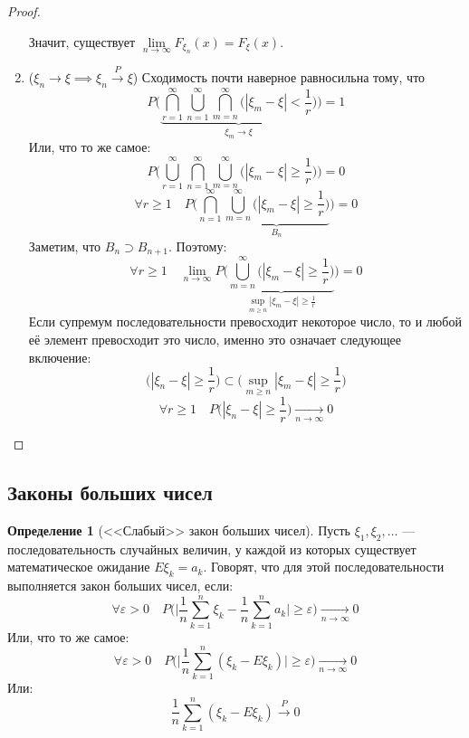 \documentclass[11pt,openany,a4paper]{scrartcl}
\theoremstyle{plain}
\theoremstyle{definition}
\newtheorem{definition}[theorem]{Определение}
\newcommand{\underto}[1]{\xrightarrow[#1]{}}
\newcommand{\overto}[1]{\xrightarrow{#1}}
\begin{document}
\begin{proof}
\begin{enumerate}
        Значит, существует $\lim\limits_{n \to \infty} F_{\xi_n}(x) = F_\xi(x)$.
        \item
        ($\xi_n \to \xi \implies \xi_n \overto{P} \xi$)
        Сходимость почти наверное равносильна тому, что
        $$
        P\bigg(\underbrace{\bigcap_{r=1}^\infty\bigcup_{n=1}^\infty
        \bigcap_{m=n}^\infty
        \Big(|\xi_m - \xi| < \frac{1}{r}\Big)}_{\xi_m \to \xi}\bigg) = 1
        $$
        Или, что то же самое:
        $$
        P\bigg(\bigcup_{r=1}^\infty\bigcap_{n=1}^\infty\bigcup_{m=n}^\infty
        \Big(|\xi_m - \xi| \geqslant \frac{1}{r}\Big)\bigg) = 0
        $$
        $$
        \forall r\geqslant 1\quad
        P\bigg(\bigcap_{n=1}^\infty\underbrace{\bigcup_{m=n}^\infty\Big(|\xi_m - \xi| 
        \geqslant \frac{1}{r}\Big)}_{B_n}\bigg) = 0
        $$
        Заметим, что $B_n \supset B_{n+1}$. Поэтому:
        $$
        \forall r\geqslant1\quad
        \lim\limits_{n \to \infty}P\bigg(\underbrace{\bigcup_{m=n}^\infty
        \Big(|\xi_m - \xi| 
        \geqslant \frac{1}{r}\Big)}_{\sup\limits_{m \geqslant n} |\xi_m - \xi| \geqslant
        \frac{1}{r}}\bigg) = 0
        $$
        Если супремум последовательности превосходит некоторое число, то и любой её элемент
        превосходит это число, именно это означает следующее включение:
        $$
        \Big(|\xi_n - \xi| \geqslant \frac{1}{r}\Big) \subset
        \Big(\sup\limits_{m\geqslant n} |\xi_m - \xi| \geqslant \frac{1}{r}\Big)
        $$
        $$
        \forall r\geqslant 1\quad
        P\Big(|\xi_n - \xi| \geqslant \frac{1}{r}\Big) \underto{n \to \infty} 0
        $$
    \end{enumerate}
\end{proof}

\subsection{Законы больших чисел}

\begin{definition}[<<Слабый>> закон больших чисел]
    Пусть $\xi_1, \xi_2,\ldots$ — последовательность случайных величин, у каждой
    из которых существует математическое ожидание $E\xi_k = a_k$. Говорят,
    что для этой последовательности выполняется закон больших чисел, если:
    $$
    \forall \varepsilon > 0\quad
    P\bigg(\bigg|\frac{1}{n}\sum\limits_{k=1}^n \xi_k -
    \frac{1}{n}\sum\limits_{k=1}^na_k\bigg| \geqslant \varepsilon \bigg)
    \underto{n \to \infty} 0
    $$
    Или, что то же самое:
    $$
    \forall \varepsilon > 0\quad
    P\bigg(\bigg|\frac{1}{n}\sum\limits_{k=1}^n(\xi_k - E\xi_k)\bigg|\geqslant 
    \varepsilon\bigg) \underto{n \to \infty} 0
    $$
    Или:
    $$
    \frac{1}{n}\sum\limits_{k=1}^n(\xi_k - E\xi_k) \overto{P} 0
    $$
\end{definition}
\end{document}
